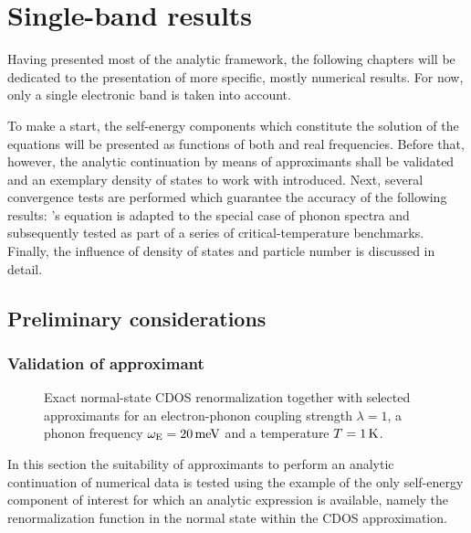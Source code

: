 
\chapter{Single-band results}
\label{single-band results}

Having presented most of the analytic framework, the following chapters will be
dedicated to the presentation of more specific, mostly numerical results. For
now, only a single electronic band is taken into account.

To make a start, the self-energy components which constitute the solution of the
 equations will be presented as functions of both
 and real frequencies. Before that, however, the analytic
continuation by means of  approximants shall be validated and an
exemplary density of states to work with introduced. Next, several convergence
tests are performed which guarantee the accuracy of the following results:
's equation is adapted to the special case of 
phonon spectra and subsequently tested as part of a series of
critical-temperature benchmarks. Finally, the influence of density of states and
particle number is discussed in detail.

\section{Preliminary considerations}

\subsection{Validation of  approximant}

\begin{figure}
    \small
    
    
    \caption[Exact renormalization function]{
        Exact normal-state CDOS renormalization together with selected
         approximants for an electron-phonon coupling strength
        $\lambda = 1$, a phonon frequency $\omega \sb{\text{E}} = 20 \, \mathrm{meV}$ and
        a temperature $T = 1 \, \mathrm K$.}
    \label{validation Pade}
\end{figure}
%
In this section the suitability of  approximants to perform an
analytic continuation of numerical data is tested using the example of the only
self-energy component of interest for which an analytic expression is available,
namely the renormalization function in the normal state within the CDOS
approximation.

